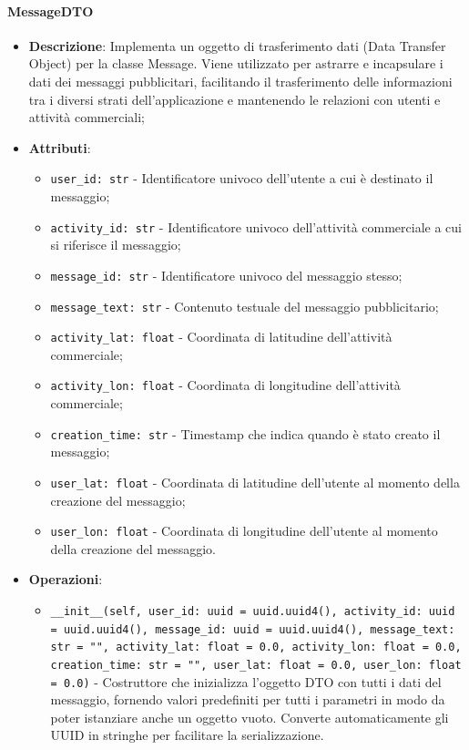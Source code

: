 \documentclass[10pt]{article}
\begin{document}
    \paragraph{MessageDTO}
    \begin{itemize} 
    \item \textbf{Descrizione}: Implementa un oggetto di trasferimento dati (Data Transfer Object) per la classe Message. Viene utilizzato per astrarre e incapsulare i dati dei messaggi pubblicitari, facilitando il trasferimento delle informazioni tra i diversi strati dell'applicazione e mantenendo le relazioni con utenti e attività commerciali;
    \item \textbf{Attributi}:
    \begin{itemize}
        \item \texttt{user\_id: str} - Identificatore univoco dell'utente a cui è destinato il messaggio;
        \item \texttt{activity\_id: str} - Identificatore univoco dell'attività commerciale a cui si riferisce il messaggio;
        \item \texttt{message\_id: str} - Identificatore univoco del messaggio stesso;
        \item \texttt{message\_text: str} - Contenuto testuale del messaggio pubblicitario;
        \item \texttt{activity\_lat: float} - Coordinata di latitudine dell'attività commerciale;
        \item \texttt{activity\_lon: float} - Coordinata di longitudine dell'attività commerciale;
        \item \texttt{creation\_time: str} - Timestamp che indica quando è stato creato il messaggio;
        \item \texttt{user\_lat: float} - Coordinata di latitudine dell'utente al momento della creazione del messaggio;
        \item \texttt{user\_lon: float} - Coordinata di longitudine dell'utente al momento della creazione del messaggio.
    \end{itemize}
    
    \item \textbf{Operazioni}:
    \begin{itemize}
        \item \texttt{\_\_init\_\_(self, user\_id: uuid = uuid.uuid4(), activity\_id: uuid = uuid.uuid4(), message\_id: uuid = uuid.uuid4(), message\_text: str = "", activity\_lat: float = 0.0, activity\_lon: float = 0.0, creation\_time: str = "", user\_lat: float = 0.0, user\_lon: float = 0.0)} - Costruttore che inizializza l'oggetto DTO con tutti i dati del messaggio, fornendo valori predefiniti per tutti i parametri in modo da poter istanziare anche un oggetto vuoto. Converte automaticamente gli UUID in stringhe per facilitare la serializzazione.
    \end{itemize}
    \end{itemize}
\end{document}
